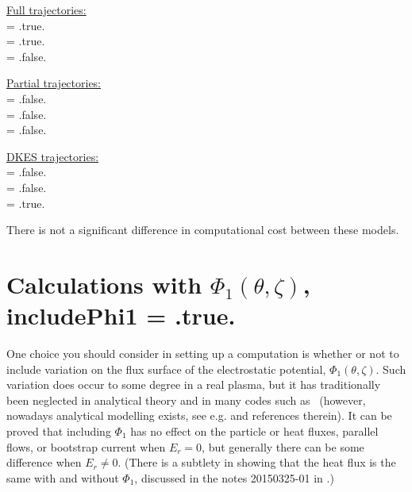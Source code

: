 {\setlength{\parindent}{0cm}

\underline{Full trajectories:}\\
{\ttfamily 
{} = .true.\\
 = .true.\\
 = .false.\\
}

\underline{Partial trajectories:}\\
{\ttfamily
{} = .false.\\
 = .false.\\
 = .false.\\
}

\underline{DKES trajectories:}\\
{\ttfamily
{} = .false.\\
 = .false.\\
 = .true.\\
}
}

There is not a significant difference in computational cost between these models.


\section{Calculations with $\Phi_1(\theta,\zeta)$, includePhi1 = {\ttfamily .true.}}
\label{sec:qn}

One choice you should consider in setting up a computation is whether or not
to include variation on the flux surface of the electrostatic potential, $\Phi_1(\theta,\zeta)$.
Such variation does occur to some degree in a real plasma, but it has traditionally been  
neglected in analytical theory and in many codes such as \dkes~(however, nowadays analytical modelling exists, see e.g. \cite{Buller2018} and references therein).  It can be proved
that including $\Phi_1$ has no effect on the particle or heat fluxes, parallel flows, or bootstrap current
when $E_r=0$, but generally there can be some difference when $E_r \ne 0$.
(There is a subtlety in showing that the heat flux is the same with and without $\Phi_1$,
discussed in the notes 20150325-01 in .) 

